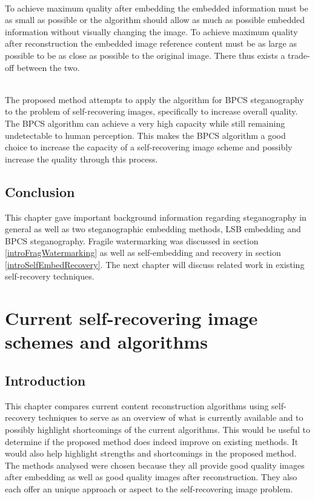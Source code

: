 \documentclass[12pt]{article}
\begin{document}
\hspace{0pt} \\
To achieve maximum quality after embedding the embedded information must be as small as possible or the algorithm should allow as much as possible embedded information without visually changing the image.
To achieve maximum quality after reconstruction the embedded image reference content must be as large as possible to be as close as possible to the original image.
There thus exists a trade-off between the two.

\hspace{0pt} \\
The proposed method attempts to apply the algorithm for BPCS steganography
to the problem of self-recovering images, specifically to increase overall quality.
The BPCS algorithm can achieve a very high capacity while still remaining undetectable to human perception.
This makes the BPCS algorithm a good choice to increase the capacity of a self-recovering image scheme and possibly increase the quality through this process.

\subsection{Conclusion}
\label{introConclusion}
This chapter gave important background information regarding steganography in general as well as two steganographic embedding methods, LSB embedding and BPCS steganography.
Fragile watermarking was discussed in section \ref{introFragWatermarking} as well as self-embedding and recovery in section \ref{introSelfEmbedRecovery}.
The next chapter will discuss related work in existing self-recovery techniques.

\section{Current self-recovering image schemes and algorithms}
\label{currentSelfRecoveringSchemes}
\subsection{Introduction}
This chapter compares current content reconstruction algorithms using self-recovery techniques to serve as an overview of what is currently available and to possibly highlight shortcomings of the current algorithms.
This would be useful to determine if the proposed method does indeed improve on existing methods. 
It would also help highlight strengths and shortcomings in the proposed method.
The methods analysed were chosen because they all provide good quality images after embedding as well as good quality images after reconstruction.
They also each offer an unique approach or aspect to the self-recovering image problem.
\end{document}
